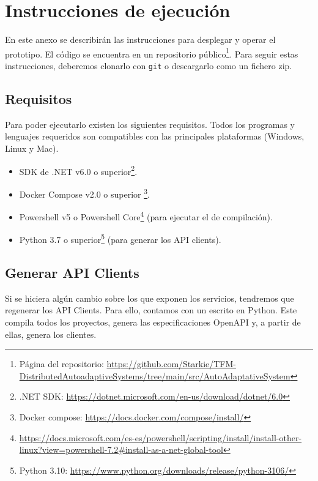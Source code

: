 \chapter{Instrucciones de ejecución}
\label{anx:ejecucion}

En este anexo se describirán las instrucciones para desplegar y operar el prototipo. El código se encuentra en un repositorio público\footnote{Página del repositorio: \url{https://github.com/Starkie/TFM-DistributedAutoadaptiveSystems/tree/main/src/AutoAdaptativeSystem}}. Para seguir estas instrucciones, deberemos clonarlo con \texttt{git} o descargarlo como un fichero zip.

\section{Requisitos}

Para poder ejecutarlo existen los siguientes requisitos. Todos los programas y lenguajes requeridos son compatibles con las principales plataformas (Windows, Linux y Mac).

\begin{itemize}[itemsep=1pt]
  \item SDK de .NET v6.0 o superior\footnote{.NET SDK: \url{https://dotnet.microsoft.com/en-us/download/dotnet/6.0}}.
  \item Docker Compose v2.0 o superior \footnote{Docker compose: \url{https://docs.docker.com/compose/install/}}.
  \item Powershell v5 o Powershell Core\footnote{\url{https://docs.microsoft.com/es-es/powershell/scripting/install/install-other-linux?view=powershell-7.2\#install-as-a-net-global-tool}} (para ejecutar el  de compilación).
  \item Python 3.7 o superior\footnote{Python 3.10: \url{https://www.python.org/downloads/release/python-3106/}} (para generar los API clients).
\end{itemize}

\section{Generar API Clients}

Si se hiciera algún cambio sobre los  que exponen los servicios, tendremos que regenerar los API Clients. Para ello, contamos con un  escrito en Python. Este compila todos los proyectos, genera las especificaciones OpenAPI y, a partir de ellas, genera los clientes.

